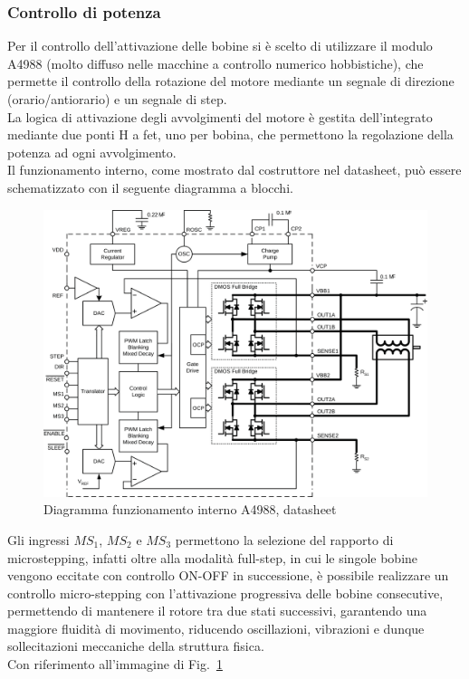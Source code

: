 \documentclass[12pt]{article}
\begin{document}
    \vfill
    
    
        \subsubsection{Controllo di potenza}
        Per il controllo dell'attivazione delle bobine si è scelto di utilizzare il modulo A4988 (molto diffuso nelle macchine a controllo numerico hobbistiche), che permette il controllo della rotazione del motore mediante un segnale di direzione (orario/antiorario) e un segnale di step.\\
        La logica di attivazione degli avvolgimenti del motore è gestita dell'integrato mediante due ponti H a fet, uno per bobina, che permettono la regolazione della potenza ad ogni avvolgimento.\\
        Il funzionamento interno, come mostrato dal costruttore nel datasheet, può essere schematizzato con il seguente diagramma a blocchi.\\
        \begin{figure}[h]
        \centering
            \includegraphics[width=370pt]{Draws/A4988_functional_diagram.png}
            \caption{Diagramma funzionamento interno A4988, datasheet}
            \label{fig:A4988_diagram}
        \end{figure}
        
        \noindent
        Gli ingressi $MS_1$, $MS_2$ e $MS_3$ permettono la selezione del rapporto di microstepping, infatti oltre alla modalità full-step, in cui le singole bobine vengono eccitate con controllo ON-OFF in successione, è possibile realizzare un controllo micro-stepping con l'attivazione progressiva delle bobine consecutive, permettendo di mantenere il rotore tra due stati successivi, garantendo una maggiore fluidità di movimento, riducendo oscillazioni, vibrazioni e dunque sollecitazioni meccaniche della struttura fisica.\\
        Con riferimento all'immagine di Fig.~\ref{fig:A4988_diagram}
\end{document}
